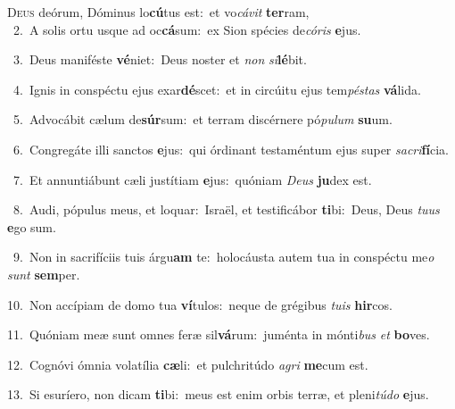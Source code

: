 \lettrine{\initial\textcolor{\initialcolor}{D}}{eus} deórum, Dóminus lo\-\textbf{cú}\-tus est:~\star et vo\-\textit{cá}\-\textit{vit} \textbf{ter}\-ram,\\
{\numbfont\textcolor{\numbcolor}{~2.}}~A solis ortu usque ad oc\-\textbf{cá}\-sum:~\star ex Sion spécies de\-\textit{có}\-\textit{ris} \textbf{e}\-jus.\par
{\numbfont\textcolor{\numbcolor}{~3.}}~Deus maniféste \textbf{vé}\-niet:~\star Deus noster et \textit{non} \textit{si}\-\textbf{lé}bit.\par
{\numbfont\textcolor{\numbcolor}{~4.}}~Ignis in conspéctu ejus exar\-\textbf{dé}\-scet:~\star et in circúitu ejus tem\-\textit{pés}\-\textit{tas} \textbf{vá}\-lida.\par
{\numbfont\textcolor{\numbcolor}{~5.}}~Advocábit cælum de\-\textbf{súr}\-sum:~\star et terram discérnere pó\-\textit{pu}\-\textit{lum} \textbf{su}\-um.\par
{\numbfont\textcolor{\numbcolor}{~6.}}~Congregáte illi sanctos \textbf{e}\-jus:~\star qui órdinant testaméntum ejus super \textit{sa}\-\textit{cri}\textbf{fí}cia.\par
{\numbfont\textcolor{\numbcolor}{~7.}}~Et annuntiábunt cæli justítiam \textbf{e}\-jus:~\star quóniam \textit{De}\-\textit{us} \textbf{ju}\-dex est.\par
{\numbfont\textcolor{\numbcolor}{~8.}}~Audi, pópulus meus, et loquar:~\dagger Israël, et testificábor \textbf{ti}\-bi:~\star Deus, Deus \textit{tu}\-\textit{us} \textbf{e}\-go sum.\par
{\numbfont\textcolor{\numbcolor}{~9.}}~Non in sacrifíciis tuis árgu\textbf{am} te:~\star holocáusta autem tua in conspéctu me\textit{o} \textit{sunt} \textbf{sem}\-per.\par
{\numbfont\textcolor{\numbcolor}{10.}}~Non accípiam de domo tua \textbf{ví}\-tulos:~\star neque de grégibus \textit{tu}\-\textit{is} \textbf{hir}\-cos.\par
{\numbfont\textcolor{\numbcolor}{11.}}~Quóniam meæ sunt omnes feræ sil\-\textbf{vá}\-rum:~\star juménta in mónti\textit{bus} \textit{et} \textbf{bo}\-ves.\par
{\numbfont\textcolor{\numbcolor}{12.}}~Cognóvi ómnia volatília \textbf{cæ}\-li:~\star et pulchritúdo \textit{a}\-\textit{gri} \textbf{me}\-cum est.\par
{\numbfont\textcolor{\numbcolor}{13.}}~Si esuríero, non dicam \textbf{ti}\-bi:~\star meus est enim orbis terræ, et pleni\-\textit{tú}\-\textit{do} \textbf{e}\-jus.\par
